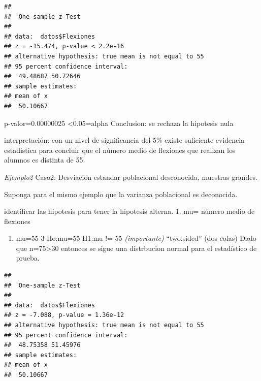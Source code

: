 \documentclass[
]{article}
\newenvironment{Shaded}{\begin{snugshade}}{\end{snugshade}}
\newcommand{\AttributeTok}[1]{\textcolor[rgb]{0.13,0.29,0.53}{#1}}
\newcommand{\ConstantTok}[1]{\textcolor[rgb]{0.56,0.35,0.01}{#1}}
\newcommand{\ControlFlowTok}[1]{\textcolor[rgb]{0.13,0.29,0.53}{\textbf{#1}}}
\newcommand{\DecValTok}[1]{\textcolor[rgb]{0.00,0.00,0.81}{#1}}
\newcommand{\FloatTok}[1]{\textcolor[rgb]{0.00,0.00,0.81}{#1}}
\newcommand{\FunctionTok}[1]{\textcolor[rgb]{0.13,0.29,0.53}{\textbf{#1}}}
\newcommand{\NormalTok}[1]{#1}
\newcommand{\SpecialCharTok}[1]{\textcolor[rgb]{0.81,0.36,0.00}{\textbf{#1}}}
\newcommand{\StringTok}[1]{\textcolor[rgb]{0.31,0.60,0.02}{#1}}
\providecommand{\tightlist}{%
  \setlength{\itemsep}{0pt}\setlength{\parskip}{0pt}}
\begin{document}
\begin{verbatim}
## 
##  One-sample z-Test
## 
## data:  datos$Flexiones
## z = -15.474, p-value < 2.2e-16
## alternative hypothesis: true mean is not equal to 55
## 95 percent confidence interval:
##  49.48687 50.72646
## sample estimates:
## mean of x 
##  50.10667
\end{verbatim}

p-valor=0.00000025 \textless0.05=alpha Conclusion: se rechaza la
hipotesis nula

interpretación: con un nivel de significancia del 5\% existe suficiente
evidencia estadistica para concluir que el número medio de flexiones que
realizan los alumnos es distinta de 55.

\emph{Ejemplo2} Caso2: Desviación estandar poblacional desconocida,
muestras grandes.

Suponga para el mismo ejemplo que la varianza poblacional es deconocida.

identificar las hipotesis para tener la hipotesis alterna. 1. mu= número
medio de flexiones

\begin{enumerate}
\def\labelenumi{\arabic{enumi}.}
\setcounter{enumi}{1}
\tightlist
\item
  mu=55 3 Ho:mu=55 H1:mu != 55 \emph{(importante)} ``two.sided'' (dos
  colas) Dado que n=75\textgreater30 entonces se sigue una distrbucion
  normal para el estadístico de prueba.
\end{enumerate}

\begin{Shaded}
\end{Shaded}

\begin{verbatim}
## 
##  One-sample z-Test
## 
## data:  datos$Flexiones
## z = -7.088, p-value = 1.36e-12
## alternative hypothesis: true mean is not equal to 55
## 95 percent confidence interval:
##  48.75358 51.45976
## sample estimates:
## mean of x 
##  50.10667
\end{verbatim}
\end{document}
